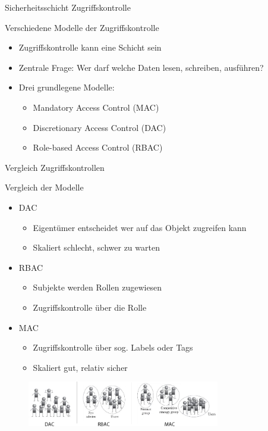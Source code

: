 \begin{frame}{Sicherheitsschicht Zugriffskontrolle}
  \begin{block}{Verschiedene Modelle der Zugriffskontrolle}
    \begin{itemize}[<+->]
      \item Zugriffskontrolle kann eine Schicht sein
      \item Zentrale Frage: Wer darf welche Daten lesen, schreiben, ausführen?
      \item Drei grundlegene Modelle:
      \begin{itemize}[<+->]
        \item Mandatory Access Control (MAC)
        \item Discretionary Access Control (DAC)
        \item Role-based Access Control (RBAC)
      \end{itemize}
    \end{itemize}
  \end{block}
\end{frame}

\begin{frame}{Vergleich Zugriffskontrollen}
  \begin{block}{Vergleich der Modelle}
    \begin{itemize}[<+->]
      \item DAC
      \begin{itemize}[<+->]
        \item Eigentümer entscheidet wer auf das Objekt zugreifen kann
        \item Skaliert schlecht, schwer zu warten
      \end{itemize}
      \item RBAC
      \begin{itemize}[<+->]
        \item Subjekte werden Rollen zugewiesen
        \item Zugriffskontrolle über die Rolle
      \end{itemize}
      \item MAC
      \begin{itemize}[<+->]
        \item Zugriffskontrolle über sog. Labels oder Tags
        \item Skaliert gut, relativ sicher
      \end{itemize}
    \end{itemize}
  \end{block}
  \begin{figure}
    \centering
    \includegraphics[width=0.75\textwidth]{assets/access_control2}
  \end{figure}
\end{frame}

